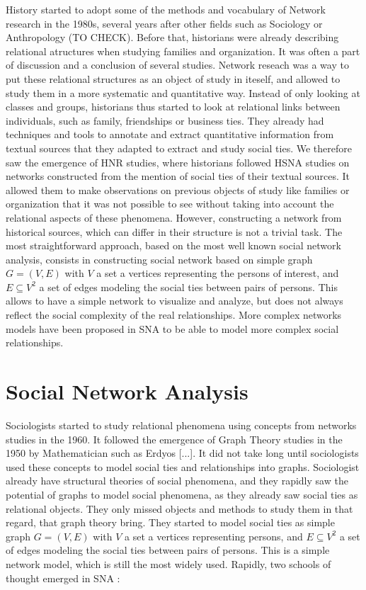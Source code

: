 History started to adopt some of the methods and vocabulary of Network research in the 1980s, several years after other fields such as Sociology or Anthropology (TO CHECK). Before that, historians were already describing relational atructures when studying families and organization. It was often a part of discussion and a conclusion of several studies.
Network reseach was a way to put these relational structures as an object of study in iteself, and allowed to study them in a more systematic and quantitative way.
Instead of only looking at classes and groups, historians thus started to look at relational links between individuals, such as family, friendships or business ties.
They already had techniques and tools to annotate and extract quantitative information from textual sources that they adapted to extract and study social ties.
We therefore saw the emergence of HNR studies, where historians followed HSNA studies on networks constructed from the mention of social ties of their textual sources.
It allowed them to make observations on previous objects of study like families or organization that it was not possible to see without taking into account the relational aspects of these phenomena.
However, constructing a network from historical sources, which can differ in their structure is not a trivial task. The most straightforward approach, based on the most well known social network analysis, consists in constructing social network based on simple graph $G = (V, E)$ with $V$ a set a vertices representing the persons of interest, and $E \subseteq V^2$ a set of edges modeling the social ties between pairs of persons.
This allows to have a simple network to visualize and analyze, but does not always reflect the social complexity of the real relationships.
More complex networks models have been proposed in SNA to be able to model more complex social relationships.



\section{Social Network Analysis}

Sociologists started to study relational phenomena using concepts from networks studies in the 1960. It followed the emergence of Graph Theory studies in the 1950 by Mathematician such as Erdyos [...]. It did not take long until sociologists used these concepts to model social ties and relationships into graphs. Sociologist already have structural theories of social phenomena, and they rapidly saw the potential of graphs to model social phenomena, as they already saw social ties as relational objects. They only missed objects and methods to study them in that regard, that graph theory bring.
They started to model social ties as simple graph $G = (V, E)$ with $V$ a set a vertices representing persons, and $E \subseteq V^2$ a set of edges modeling the social ties between pairs of persons. This is a simple network model, which is still the most widely used.
Rapidly, two schools of thought emerged in SNA :

